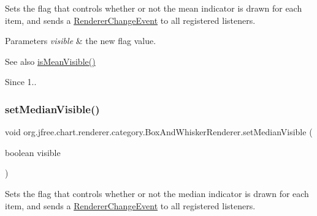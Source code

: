 Sets the flag that controls whether or not the mean indicator is drawn for each item, and sends a \mbox{\hyperlink{}{Renderer\+Change\+Event}} to all registered listeners.


\begin{DoxyParams}{Parameters}
{\em visible} & the new flag value.\\
\hline
\end{DoxyParams}
\begin{DoxySeeAlso}{See also}
\mbox{\hyperlink{classorg_1_1jfree_1_1chart_1_1renderer_1_1category_1_1_box_and_whisker_renderer_a28fffbc9213cc6fc45f5dc6ad899685b}{is\+Mean\+Visible()}}
\end{DoxySeeAlso}
\begin{DoxySince}{Since}
1.. 
\end{DoxySince}
\mbox{\label{classorg_1_1jfree_1_1chart_1_1renderer_1_1category_1_1_box_and_whisker_renderer_a34ea9d397f5039e7fac6658313631b60}} 
\subsubsection{\texorpdfstring{set\+Median\+Visible()}{setMedianVisible()}}
{\footnotesize\ttfamily void org.\+jfree.\+chart.\+renderer.\+category.\+Box\+And\+Whisker\+Renderer.\+set\+Median\+Visible (\begin{DoxyParamCaption}\item[{boolean}]{visible }\end{DoxyParamCaption})}

Sets the flag that controls whether or not the median indicator is drawn for each item, and sends a \mbox{\hyperlink{}{Renderer\+Change\+Event}} to all registered listeners.


